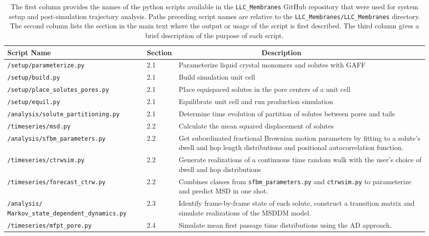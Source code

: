 \documentclass{article}
\begin{document}
  \begin{table}[htb!]
  \centering
  \begin{tabular}{|A|B|C|}
  \hline
  \textbf{Script Name} & \textbf{Section} & ~~~~~~~~~~~~~~~~~~~~~\textbf{Description} \\
  \hline

  \texttt{/setup/parameterize.py}            & 2.1 & Parameterize liquid crystal monomers and solutes with GAFF \\ \hline
  \texttt{/setup/build.py}                   & 2.1 & Build simulation unit cell \\ \hline
  \texttt{/setup/place\_solutes\_pores.py}   & 2.1 & Place equispaced solutes in the pore centers of a unit cell \\\hline
  \texttt{/setup/equil.py}                   & 2.1 & Equilibrate unit cell and run production simulation \\\hline
  \texttt{/analysis/solute\_partitioning.py} & 2.1 & Determine time evolution of partition of solutes between pores and tails \\\hline
  \texttt{/timeseries/msd.py}                & 2.2 & Calculate the mean squared displacement of solutes \\\hline
  \texttt{/analysis/sfbm\_parameters.py}     & 2.2 & Get subordinated fractional Brownian motion parameters by fitting to a solute's dwell and hop length distributions and positional autocorrelation function. \\\hline
  \texttt{/timeseries/ctrwsim.py}            & 2.2 & Generate realizations of a continuous time random walk with the user's choice of dwell and hop distributions \\\hline
  \texttt{/timeseries/forecast\_ctrw.py}     & 2.2 & Combines classes from \texttt{sfbm\_parameters.py} and \texttt{ctrwsim.py} to parameterize and predict MSD in one shot. \\\hline
  \texttt{/analysis/ Markov\_state\_dependent\_dynamics.py} & 2.3 & Identify frame-by-frame state of each solute, construct a transition matrix and simulate realizations of the MSDDM model. \\\hline
  \texttt{/timeseries/mfpt\_pore.py}          & 2.4 & Simulate mean first passage time distributions using the AD approach. \\\hline 
  \end{tabular}

  \caption{The first column provides the names of the python scripts available in
  the \texttt{LLC\_Membranes} GitHub repository that were used for system setup and
  post-simulation trajectory analysis. Paths preceding script names are relative to the
  \texttt{LLC\_Membranes/LLC\_Membranes} directory. The second column lists the section in the main
  text where the output or usage of the script is first described. The third column
  gives a brief description of the purpose of each script.
  }~\label{table:python_scripts}

  \end{table}
  
\end{document}
